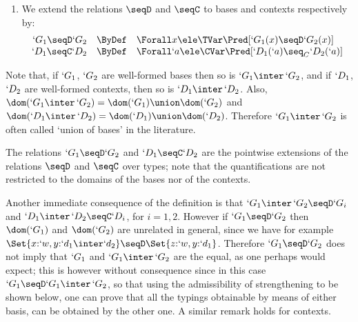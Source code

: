 \documentclass{lmcs}
\begin{document}
 \begin{defi} \label{def:ext-leq}

 \begin{enumerate}

 \firstitem \label{def:ext-leq-ii}
For bases $`G_1, `G_2$ we define the basis $`G_1\inter\,`G_2$ by:
%
 \[ \begin{array}{rcl}
`G_1\inter\,`G_2 &\ByDef& 
	\Set{x{:}`G_1(x)\inter\, `G_2(x) \mid x \ele \dom(`G_1) \cap \dom(`G_2) } \\ %
	&& \quad \Union \Set {x{:}`d \ele `G_1 \mid x \notele \Dom(`G_2) } \\ %
	&& \quad \Union \Set {x{:}`d \ele `G_2 \mid x \notele \Dom(`G_1) }
 \end{array} \]
For contexts $`D_1,`D _2$, we define the context $`D_1\inter\,`D _2$ similarly.
 
 \item \label{def:ext-leq-iii}
We extend the relations $\seqD$ and $\seqC$ to bases and contexts respectively by:
%
 \[ \begin{array}[t]{rcl}
`G_1 \seqD `G_2 & \ByDef & 
	\Forall x\ele \TVar \Pred[ `G_1(x) \seqD `G_2(x) ]
	\\ %
`D_1 \seqC `D_2& \ByDef & 
	 \Forall `a\ele \CVar \Pred[ `D_1(`a) \seq_C `D_2(`a) ]
 \end{array} \]

 \end{enumerate}
 \end{defi}

Note that, if $`G_1$, $`G_2$ are well-formed bases then so is $`G_1\inter\,`G_2$, and if $`D_1$, $`D _2$ are well-formed contexts, then so is $`D_1\inter\,`D _2$. 
Also, $\dom(`G_1\inter\,`G_2) = \dom(`G_1) \union \dom(`G_2)$ and
$\dom(`D_1\inter\,`D _2) = \dom(`D_1) \union \dom(`D_2)$. 
Therefore $`G_1\inter\,`G_2$ is often called `union of bases' in the literature.

The relations $`G_1 \seqD `G_2$ and $`D_1 \seqC `D_2$ are the pointwise extensions of the relations $\seqD$ and $\seqC$ over types; note that the quantifications are not restricted to the domains of the bases nor of the contexts.

Another immediate consequence of the definition is that $`G_1 \inter\,`G_2 \seqD `G_i$ and $`D_1 \inter\,`D _2 \seqC `D_i$, for $i = 1,2$. 
However if $`G_1 \seqD `G_2$ then $\dom(`G_1)$ and $\dom(`G_2)$ are unrelated in general, since we have for example $\Set{x{:}`w,y{:}`d_1\inter`d_2} \seqD \Set{z{:}`w,y{:}`d_1}$. 
Therefore $`G_1 \seqD `G_2$ does not imply that $`G_1$ and $`G_1 \inter\,`G_2$ are the equal, as one perhaps would expect; this is however without consequence since in this case $`G_1 \seqD `G_1 \inter\,`G_2$, so that using the admissibility of strengthening to be shown below, one can prove that all the typings obtainable by means of either basis, can be obtained by the other one.
A similar remark holds for contexts.
\end{document}
